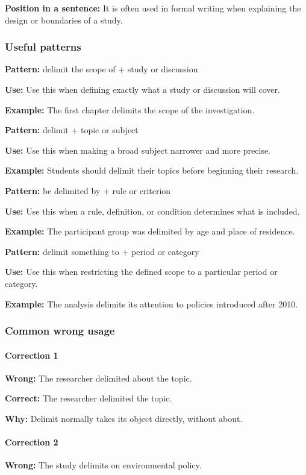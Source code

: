 \documentclass[11pt]{article}
\begin{document}
\textbf{Position in a sentence:} It is often used in formal writing when explaining the design or boundaries of a study.

\subsubsection{Useful patterns}
\textbf{Pattern:} delimit the scope of + study or discussion

\textbf{Use:} Use this when defining exactly what a study or discussion will cover.

\textbf{Example:} The first chapter delimits the scope of the investigation.

\textbf{Pattern:} delimit + topic or subject

\textbf{Use:} Use this when making a broad subject narrower and more precise.

\textbf{Example:} Students should delimit their topics before beginning their research.

\textbf{Pattern:} be delimited by + rule or criterion

\textbf{Use:} Use this when a rule, definition, or condition determines what is included.

\textbf{Example:} The participant group was delimited by age and place of residence.

\textbf{Pattern:} delimit something to + period or category

\textbf{Use:} Use this when restricting the defined scope to a particular period or category.

\textbf{Example:} The analysis delimits its attention to policies introduced after 2010.

\subsubsection{Common wrong usage}
\paragraph{Correction 1}
\textbf{Wrong:} The researcher delimited about the topic.

\textbf{Correct:} The researcher delimited the topic.

\textbf{Why:} Delimit normally takes its object directly, without about.

\paragraph{Correction 2}
\textbf{Wrong:} The study delimits on environmental policy.
\end{document}
